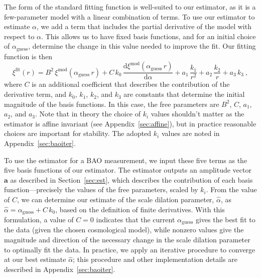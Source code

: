 \documentclass[modern]{aastex62}
\newcommand{\dd}{\mathrm{d}}
\newcommand{\bld}[1]{\bm{#1}} %
\begin{document}
The form of the standard fitting function is well-suited to our estimator, as it is a few-parameter model with a linear combination of terms.
To use our estimator to estimate $\alpha$, we add a term that includes the partial derivative of the model with respect to $\alpha$.
This allows us to have fixed basis functions, and for an initial choice of $\alpha_\mathrm{guess}$, determine the change in this value needed to improve the fit. 
Our fitting function is then
\begin{equation} \label{eq:baoiter_fit}
\xi^\mathrm{fit}(r) = B^2\,\xi^\mathrm{mod}(\alpha_\mathrm{guess}\,r) + C\,k_0\,\frac{\dd \xi^\mathrm{mod}(\alpha_\mathrm{guess}\,r)}{\dd \alpha} + a_1\,\frac{k_1}{r^2} + a_2\,\frac{k_2}{r} + a_3\,k_3 ~,
\end{equation}
where $C$ is an additional coefficient that describes the contribution of the derivative term, and $k_0$, $k_1$, $k_2$, and $k_3$ are constants that determine the initial magnitude of the basis functions.
In this case, the free parameters are $B^2$, $C$, $a_1$, $a_2$, and $a_3$.
Note that in theory the choice of $k_i$ values shouldn't matter as the estimator is affine invariant (see Appendix~\ref{sec:affine}), but in practice reasonable choices are important for stability.
The adopted $k_i$ values are noted in Appendix~\ref{sec:baoiter}.

To use the estimator for a BAO measurement, we input these five terms as the five basis functions of our estimator.
The estimator outputs an amplitude vector $\bld{a}$ as described in Section~\ref{sec:est}, which describes the contribution of each basis function---precisely the values of the free parameters, scaled by $k_i$.
From the value of $C$, we can determine our estimate of the scale dilation parameter, $\hat{\alpha}$, as $\hat{\alpha} = \alpha_\mathrm{guess} + C\,k_0$, based on the definition of finite derivatives. 
With this formulation, a value of $C=0$ indicates that the current $\alpha_\mathrm{guess}$ gives the best fit to the data (given the chosen cosmological model), while nonzero values give the magnitude and direction of the necessary change in the scale dilation parameter to optimally fit the data.
In practice, we apply an iterative procedure to converge at our best estimate $\hat{\alpha}$; this procedure and other implementation details are described in Appendix~\ref{sec:baoiter}.
\end{document}
